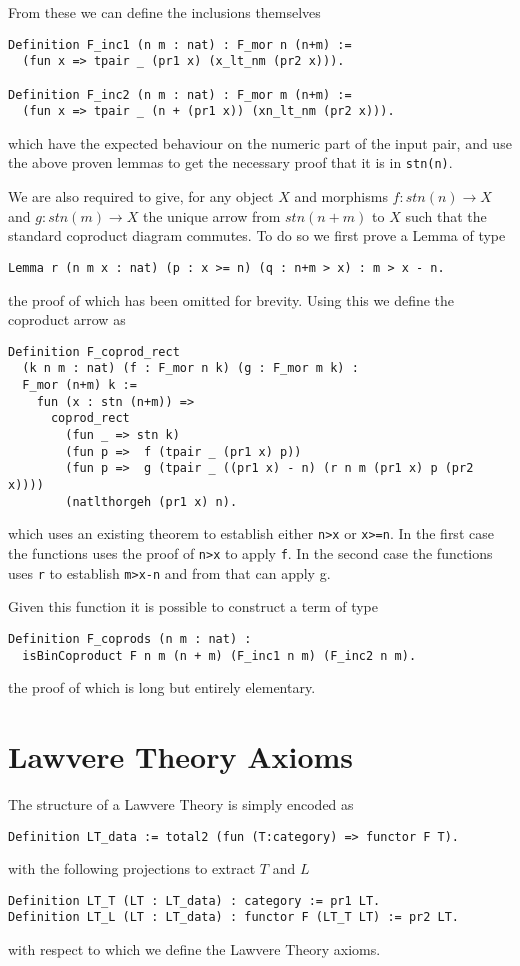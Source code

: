 From these we can define the inclusions themselves
\begin{lstlisting}
Definition F_inc1 (n m : nat) : F_mor n (n+m) := 
  (fun x => tpair _ (pr1 x) (x_lt_nm (pr2 x))).

Definition F_inc2 (n m : nat) : F_mor m (n+m) := 
  (fun x => tpair _ (n + (pr1 x)) (xn_lt_nm (pr2 x))).
\end{lstlisting}
which have the expected behaviour on the numeric part of the input pair, and use
the above proven lemmas to get the necessary proof that it is in \lstinline|stn(n)|.

We are also required to give, for any object $X$ and morphisms $f: stn(n)\to X$
and $g: stn(m)\to X$ the unique arrow from $stn(n+m)$ to $X$ such that the
standard coproduct diagram commutes. To do so we first prove a Lemma of type
\begin{lstlisting}
Lemma r (n m x : nat) (p : x >= n) (q : n+m > x) : m > x - n.
\end{lstlisting}
the proof of which has been omitted for brevity. Using this we define the
coproduct arrow as
\begin{lstlisting}
Definition F_coprod_rect 
  (k n m : nat) (f : F_mor n k) (g : F_mor m k) : 
  F_mor (n+m) k :=
    fun (x : stn (n+m)) => 
      coprod_rect 
        (fun _ => stn k)
        (fun p =>  f (tpair _ (pr1 x) p))
        (fun p =>  g (tpair _ ((pr1 x) - n) (r n m (pr1 x) p (pr2 x))))
        (natlthorgeh (pr1 x) n).
\end{lstlisting}
which uses an existing theorem to establish either \lstinline|n>x| or \lstinline|x>=n|. In
the first case the functions uses the proof of \lstinline|n>x| to apply \lstinline|f|. In
the second case the functions uses \lstinline|r| to establish \lstinline|m>x-n| and from
that can apply g.

Given this function it is possible to construct a term of type
\begin{lstlisting}
Definition F_coprods (n m : nat) : 
  isBinCoproduct F n m (n + m) (F_inc1 n m) (F_inc2 n m).
\end{lstlisting}
the proof of which is long but entirely elementary.

\section{Lawvere Theory Axioms}
The structure of a Lawvere Theory is simply encoded as
\begin{lstlisting}
Definition LT_data := total2 (fun (T:category) => functor F T).
\end{lstlisting}
with the following projections to extract $T$ and $L$
\begin{lstlisting}
Definition LT_T (LT : LT_data) : category := pr1 LT.
Definition LT_L (LT : LT_data) : functor F (LT_T LT) := pr2 LT.
\end{lstlisting}
with respect to which we define the Lawvere Theory axioms.

